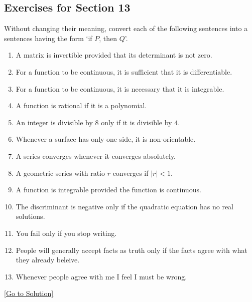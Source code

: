 \subsection{Exercises for Section 13}
\begin{exercise}\label{ex:2.13}
    Without changing their meaning, convert each of the following sentences into a sentences having the form `if $P$, then $Q$'. 
    \begin{enumerate}
        \item A matrix is invertible provided that its determinant is not zero. 
        \item For a function to be continuous, it is sufficient that it is differentiable. 
        \item For a function to be continuous, it is necessary that it is integrable. 
        \item  A function is rational if it is a polynomial.
        \item An integer is divisible by $8$ only if it is divisible by $4$. 
        \item Whenever a surface has only one side, it is non-orientable. 
        \item A series converges whenever it converges absolutely. 
        \item A geometric series with ratio $r$ converges if $\lvert r \rvert<1$.
        \item A function is integrable provided the function is continuous. 
        \item The discriminant is negative only if the quadratic equation has no real solutions. 
        \item You fail only if you stop writing.  
        \item People will generally accept facts as truth only if the facts agree with what they already beleive. 
        \item Whenever people agree with me I feel I must be wrong. 
    \end{enumerate}
\end{exercise}\hyperref[sol:2.13]{[Go to Solution]}